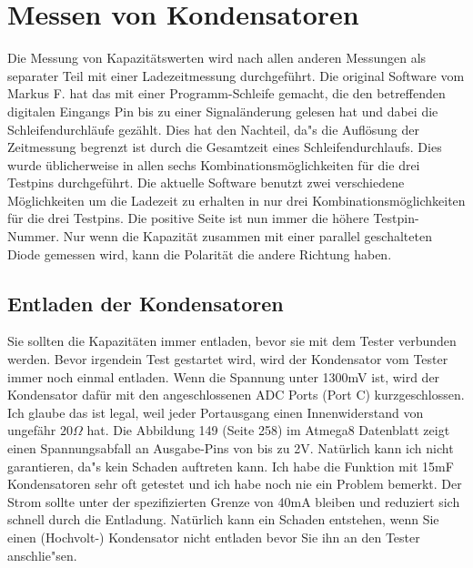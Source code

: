 \section{Messen von Kondensatoren}
Die Messung von Kapazit\"atswerten wird nach allen anderen Messungen als separater Teil mit einer Ladezeitmessung 
durchgef\"uhrt.
Die original Software vom Markus F. hat das mit einer Programm-Schleife gemacht, die den betreffenden digitalen
Eingangs Pin bis zu einer Signal\"anderung gelesen hat und dabei die Schleifendurchl\"aufe gez\"ahlt.
Dies hat den Nachteil, da"s die Aufl\"osung der Zeitmessung begrenzt ist durch die Gesamtzeit eines Schleifendurchlaufs.
Dies wurde \"ublicherweise in allen sechs Kombinationsm\"oglichkeiten f\"ur die drei Testpins durchgef\"uhrt.
Die aktuelle Software benutzt zwei verschiedene M\"oglichkeiten um die Ladezeit zu erhalten in nur drei
Kombinationsm\"oglichkeiten f\"ur die drei Testpins.
Die positive Seite ist nun immer die h\"ohere Testpin-Nummer.
Nur wenn die Kapazit\"at zusammen mit einer parallel geschalteten Diode gemessen wird,
kann die Polarit\"at die andere Richtung haben.

\subsection{Entladen der Kondensatoren}
Sie sollten die Kapazit\"aten immer entladen, bevor sie mit dem Tester verbunden werden.
Bevor irgendein Test gestartet wird, wird der Kondensator vom Tester immer noch einmal entladen.
Wenn die Spannung unter 1300mV ist, wird der Kondensator daf\"ur mit den angeschlossenen ADC Ports (Port C) kurzgeschlossen.
Ich glaube das ist legal, weil jeder Portausgang einen Innenwiderstand von ungef\"ahr \(20\Omega\) hat.
Die Abbildung 149 (Seite 258) im Atmega8 Datenblatt \cite{ATmega8} zeigt einen Spannungsabfall an Ausgabe-Pins von bis zu 2V.
Nat\"urlich kann ich nicht garantieren, da"s kein Schaden auftreten kann.
Ich habe die Funktion mit 15mF Kondensatoren sehr oft getestet und ich habe noch nie ein Problem bemerkt.
Der Strom sollte unter der spezifizierten Grenze von 40mA bleiben und reduziert sich schnell durch die Entladung.
Nat\"urlich kann ein Schaden entstehen, wenn Sie einen (Hochvolt-) Kondensator nicht entladen bevor Sie ihn an den Tester anschlie"sen.

